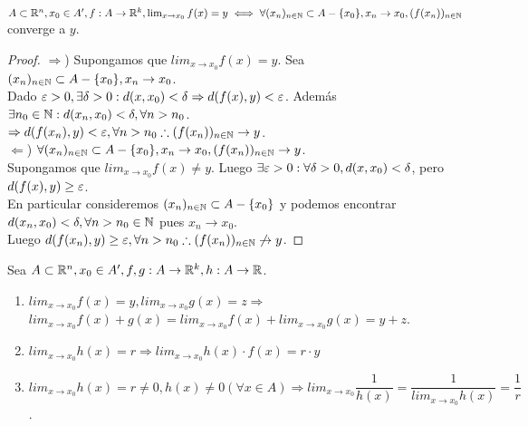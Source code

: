 \begin{prop}
  $A \subset \mathbb{R}^n, x_0 \in A^{\prime}, f: A \to \mathbb{R}^k, \lim_{x \to x_0} f(x) = y \iff \forall (x_n)_{n \in \mathbb{N}} \subset A - \{x_0\}, x_n \to x_0, (f(x_n))_{n \in \mathbb{N}}$ converge a $y$.
  \begin{proof}
    $\Rightarrow$) Supongamos que $lim_{x \to x_0} f(x) = y$. Sea $(x_n)_{n \in \mathbb{N}} \subset A - \{x_0\}, x_n \to x_0$. \\
    Dado $\varepsilon > 0, \exists \delta > 0 : d(x, x_0) < \delta \Rightarrow d(f(x), y) < \varepsilon$. Además $\exists n_0 \in \mathbb{N} : d(x_n, x_0) < \delta, \forall n > n_0$. \\
    $\Rightarrow d(f(x_n), y) < \varepsilon, \forall n > n_0 \therefore (f(x_n))_{n \in \mathbb{N}} \to y$. \\

    $\Leftarrow$) $\forall (x_n)_{n \in \mathbb{N}} \subset A - \{x_0\}, x_n \to x_0, (f(x_n))_{n \in \mathbb{N}} \to y$. \\
    Supongamos que $lim_{x \to x_0} f(x) \neq y$. Luego $\exists \varepsilon > 0 : \forall \delta > 0, d(x, x_0) < \delta$, pero $d(f(x), y) \geq \varepsilon$. \\
    En particular consideremos $(x_n)_{n \in \mathbb{N}} \subset A - \{x_0\}$ y podemos encontrar $d(x_n, x_0) < \delta, \forall n > n_0 \in \mathbb{N}$ pues $x_n \to x_0$. \\
    Luego $d(f(x_n), y) \geq \varepsilon, \forall n > n_0 \therefore (f(x_n))_{n \in \mathbb{N}} \not \to y$.
  \end{proof}
\end{prop}

\begin{prop}
  Sea $A \subset \mathbb{R}^n, x_0 \in A^{\prime}, f, g: A \to \mathbb{R}^k, h: A \to \mathbb{R}$.
  \begin{enumerate}
    \item $lim_{x \to x_0} f(x) = y, lim_{x \to x_0} g(x) = z \Rightarrow$ \\ $lim_{x \to x_0} f(x) + g(x) = lim_{x \to x_0} f(x) + lim_{x \to x_0} g(x) = y+z$.
    \item $lim_{x \to x_0} h(x) = r \Rightarrow lim_{x \to x_0} h(x) \cdot f(x) = r \cdot y$
    \item $lim_{x \to x_0} h(x) = r \neq 0, h(x) \neq 0 (\forall x \in A) \Rightarrow lim_{x \to x_0} \dfrac{1}{h(x)} = \dfrac{1}{lim_{x \to x_0} h(x)} = \dfrac{1}{r}$.
  \end{enumerate}
\end{prop}


